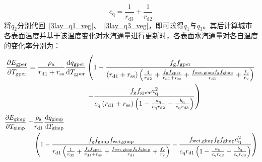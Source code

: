 %
\begin{equation}
  c_{\mathrm{q}} = \frac{1}{r_{\mathrm{d3}}} + \frac{1}{r_{\mathrm{d2}}}
\end{equation}
将$q_{2}$分别代回~\eqref{3lay_q1_veg}、~\eqref{3lay_q3_veg}，即可求得$q_{1}$与$q_{3}$。其后计算城市各表面温度并基于该温度变化对水汽通量进行更新时，各表面水汽通量对各自温度的变化率分别为：
\begin{equation}
  \begin{split}
    \frac{\partial  E_{\mathrm{gper}}}{\partial T_{\mathrm{gper}}} =\frac{\rho _{\rm a}}{r_{\mathrm{d1}}+r_{\mathrm{ss}}} \frac{{\mathrm {d}} q_{\mathrm{gper}}}{{\mathrm {d}} T_{\mathrm{gper}}} &\left(1-\frac{f_{\mathrm{g}}f_{\mathrm{gper}}}{\left(r_{\mathrm{d1}}+r_{\mathrm{ss}}\right) \left(\frac{1}{r_{\mathrm{d2}}} + \frac{f_{\mathrm{g}} f_{\mathrm{gper}}}{r_{\mathrm{d1}} + r_{\mathrm{ss}}} + \frac{f_{\mathrm{wet,gimp}} f_{\mathrm{g}} f_{\mathrm{gimp}}}{r_{\mathrm{d1}}}+\frac{f_{\rm v}}{r_{\mathrm{v}}}\right)}  \right. \\
    & \left. - \frac{f_{\mathrm{g}} f_{\mathrm{gper}} a_{\mathrm{q}}^2}{c_{\mathrm{q}}\left(r_{\mathrm{d1}}+r_{\mathrm{ss}}\right) \left( 1 - \frac{a_{\mathrm{q}}}{c_{\mathrm{q}} r_{\mathrm{d2}}} - \frac{b_{\mathrm{q}}}{c_{\mathrm{q}} r_{\mathrm{d3}}} \right)}\right)
  \end{split}
\end{equation}
%
\begin{equation}
  \begin{split}
    \frac{\partial  E_{\mathrm{gimp}}}{\partial T_{\mathrm{gimp}}} = &\frac{\rho _{\rm a}}{r_{\mathrm{d1}}} \frac{{\mathrm {d}} q_{\mathrm{gimp}}}{{\mathrm {d}} T_{\mathrm{gimp}}} \\
    &\left(1-\frac{f_{\mathrm{g}}f_{\mathrm{gimp}}f_{\mathrm{wet,gimp}}}{r_{\mathrm{d1}} \left(\frac{1}{r_{\mathrm{d2}}} + \frac{f_{\mathrm{g}} f_{\mathrm{gper}}}{r_{\mathrm{d1}} + r_{\mathrm{ss}}} + \frac{f_{\mathrm{wet,gimp}} f_{\mathrm{g}} f_{\mathrm{gimp}}}{r_{\mathrm{d1}}}+\frac{f_{\rm v}}{r_{\mathrm{v}}}\right)} - \frac{f_{\mathrm{wet,gimp}} f_{\mathrm{g}} f_{\mathrm{gimp}} a_{\mathrm{q}}^2}{c_{\mathrm{q}} r_{\mathrm{d1}}\left( 1 - \frac{a_{\mathrm{q}}}{c_{\mathrm{q}} r_{\mathrm{d2}}} - \frac{b_{\mathrm{q}}}{c_{\mathrm{q}} r_{\mathrm{d3}}} \right)}\right)
  \end{split}
\end{equation}
%
